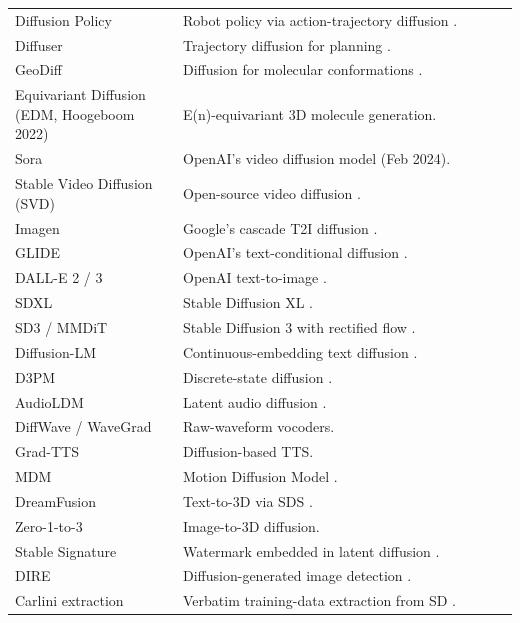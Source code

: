 \documentclass{article}
\begin{document}
\begin{table}[t]
\begin{tabular}{>{\raggedright\arraybackslash}p{0.3333\linewidth}
  >{\raggedright\arraybackslash}p{0.6667\linewidth}}
Diffusion Policy & Robot policy via action-trajectory diffusion \citep{chi2023diffusionpolicyvis}. \\
Diffuser & Trajectory diffusion for planning \citep{janner2022planningwithdiffus}. \\
GeoDiff & Diffusion for molecular conformations \citep{xu2022geodiffageometricd}. \\
Equivariant Diffusion (EDM, Hoogeboom 2022) & E(n)-equivariant 3D molecule generation. \\
Sora & OpenAI's video diffusion model (Feb 2024). \\
Stable Video Diffusion (SVD) & Open-source video diffusion \citep{blattmann20232023}. \\
Imagen & Google's cascade T2I diffusion \citep{saharia20222022}. \\
GLIDE & OpenAI's text-conditional diffusion \citep{nichol2021improveddenoisingd}. \\
DALL-E 2 / 3 & OpenAI text-to-image \citep{ramesh2022hierarchicaltextco}. \\
SDXL & Stable Diffusion XL \citep{podell2023sdxlimprovinglaten}. \\
SD3 / MMDiT & Stable Diffusion 3 with rectified flow \citep{esser20242024}. \\
Diffusion-LM & Continuous-embedding text diffusion \citep{li2022diffusionlmimprove}. \\
D3PM & Discrete-state diffusion \citep{austin2021structureddenoisin}. \\
AudioLDM & Latent audio diffusion \citep{liu2023zero1to3zeroshoton}. \\
DiffWave / WaveGrad & Raw-waveform vocoders. \\
Grad-TTS & Diffusion-based TTS. \\
MDM & Motion Diffusion Model \citep{tevet2023humanmotiondiffusi}. \\
DreamFusion & Text-to-3D via SDS \citep{poole2023dreamfusiontextto3}. \\
Zero-1-to-3 & Image-to-3D diffusion. \\
Stable Signature & Watermark embedded in latent diffusion \citep{fernandez2023thestablesignature}. \\
DIRE & Diffusion-generated image detection \citep{wang20232023}. \\
Carlini extraction & Verbatim training-data extraction from SD \citep{carlini2023extractingtraining}. \\
\end{tabular}
\end{table}
\end{document}
